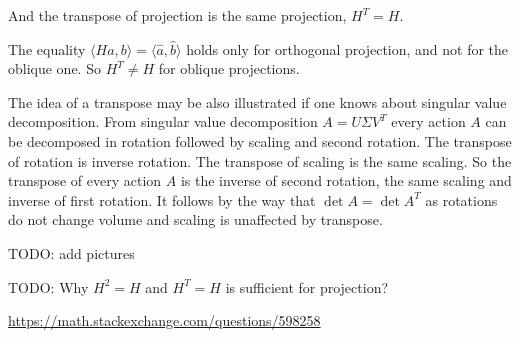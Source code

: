 And the transpose of projection is the same projection, $H^T=H$.

The equality $\langle Ha, b\rangle = \langle \hat a, \hat b \rangle$ holds only for orthogonal projection,
and not for the oblique one.
So $H^T \neq H$ for oblique projections.


The idea of a transpose may be also illustrated if one knows about singular value decomposition.
From singular value decomposition $A = U\Sigma V^T$ every action $A$ can be decomposed in rotation followed by scaling and
second rotation.
The transpose of rotation is inverse rotation. The transpose of scaling is the same scaling.
So the transpose of every action $A$ is the inverse of second rotation, the same scaling and inverse of first rotation.
It follows by the way that $\det A = \det A^T$ as rotations do not change volume and scaling is unaffected by transpose.

TODO: add pictures

TODO: Why $H^2=H$ and $H^T=H$ is sufficient for projection?

\url{https://math.stackexchange.com/questions/598258}
